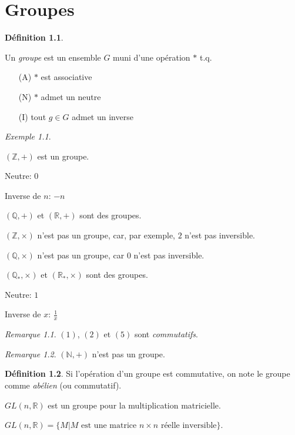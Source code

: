 \documentclass{report}
\newcommand*{\reels}{\mathbb{R}}
\newcommand*{\entiers}{\mathbb{Z}}
\newcommand*{\rationels}{\mathbb{Q}}
\newcommand*{\naturels}{\mathbb{N}}
\theoremstyle{definition}
\newtheorem*{defin}{D\'efinition}
\theoremstyle{remark}
\newtheorem*{exem}{Exemple}
\newtheorem*{rema}{Remarque}
\begin{document}
	\chapter{Groupes}
	\begin{defin}
		~

		Un \emph{groupe} est un ensemble $G$ muni d'une op\'eration $*$ t.q.
		\begin{itemize}
			\item[(A)] $*$ est associative
			\item[(N)] $*$ admet un neutre
			\item[(I)] tout $g \in G$ admet un inverse
		\end{itemize}
	\end{defin}
	\begin{exem}
		~

		\begin{nlist}
			\item $(\entiers,+)$ est un groupe.

			Neutre: $0$

			Inverse de $n$: $-n$
			\item $(\rationels,+)$ et $(\reels,+)$ sont des groupes.
			\item $(\entiers,\times)$ n'est pas un groupe, car, par exemple, $2$ n'est pas inversible.
			\item $(\rationels,\times)$ n'est pas un groupe, car $0$ n'est pas inversible.
			\item $(\rationels_*,\times)$ et $(\reels_*,\times)$ sont des groupes.

			Neutre: $1$

			Inverse de $x$: $\frac{1}{x}$
		\end{nlist}
		\begin{rema}
			$(1)$, $(2)$ et $(5)$ sont \emph{commutatifs}.
		\end{rema}
		\begin{rema}
			$(\naturels,+)$ n'est pas un groupe.
		\end{rema}
		\begin{defin}
			Si l'op\'eration d'un groupe est commutative, on note le groupe comme \emph{ab\'elien} (ou commutatif).
		\end{defin}
		\begin{nlist}[resume]
			\item $GL(n,\reels)$ est un groupe pour la multiplication matricielle.

			$GL(n,\reels)=\{M|M \text{ est une matrice $n\times n$ r\'eelle inversible}\}$.


\end{nlist}
\end{exem}
\end{document}
